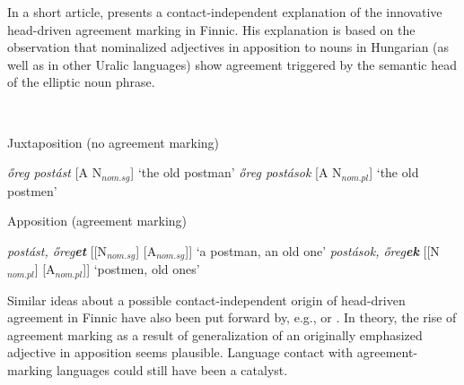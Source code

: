 {In a short article, \citet{mark1979} presents a contact-independent explanation of the innovative head-driven agreement marking in Finnic. His explanation is based on the observation that nominalized adjectives in apposition to nouns in Hungarian (as well as in other Uralic languages) show agreement triggered by the semantic head of the elliptic noun phrase.
\begin{exe} \label{hung ap}
\ex {}\\
\begin{xlist}
\ex Juxtaposition (no agreement marking)
\begin{xlist}
\ex \textit{őreg postást} [A N$_{nom.sg}$] ‘the old postman’
\ex \textit{őreg postások} [A N$_{nom.pl}$] ‘the old postmen’
\end{xlist}
\ex Apposition (agreement marking)
\begin{xlist}
\ex \textit{postást, őreg\textbf{et}} [[N$_{nom.sg}$] [A$_{nom.sg}$]] ‘a postman, an old one’
\ex \textit{postások, őreg\textbf{ek}} [[N$_{nom.pl}$] [A$_{nom.pl}$]] ‘postmen, old ones’
\end{xlist}
\end{xlist}
\end{exe}
Similar ideas about a possible contact-independent origin of head-driven agreement in Finnic have also been put forward by, e.g., \cite{ravila1941} or \cite{papp1962}. In theory, the rise of agreement marking as a result of generalization of an originally emphasized adjective in apposition seems plausible. Language contact with agreement-marking languages could still have been a catalyst. 

}
